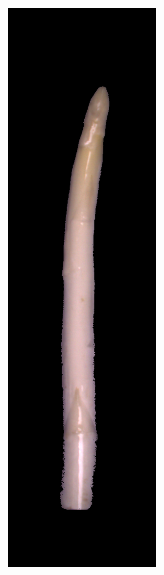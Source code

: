 \begin{figure}[!htb]
	\centering
	\vspace{20pt}
	\begin{subfigure}{0.3\textwidth}
		\includegraphics[width=0.80\linewidth]{Figures/chapter03/diff-img-bent.png}

\end{subfigure}
\end{figure}
